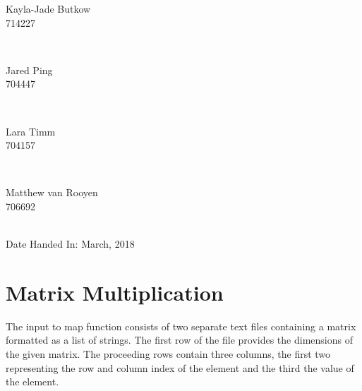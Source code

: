 \documentclass[10pt,twocolumn]{witseiepaper}
\begin{document}
\begin{titlepage}
		
		\begin{minipage}{0.4\textwidth}
			\begin{flushleft} \large
				Kayla-Jade Butkow \\ 714227 %
			\end{flushleft}
		\end{minipage}
		~
		\begin{minipage}{0.4\textwidth}
			\begin{flushright} \large
				Jared Ping \\ 704447
			\end{flushright}
		\end{minipage}\\[1cm]
		
		\begin{minipage}{0.4\textwidth}
			\begin{flushleft} \large
				Lara Timm \\ 704157
			\end{flushleft}
		\end{minipage}
		~
		\begin{minipage}{0.4\textwidth}
			\begin{flushright} \large
				Matthew van Rooyen \\ 706692
			\end{flushright}
		\end{minipage}\\[1cm]
		
		
		
		{\large Date Handed In:  March, 2018}\\[1cm] 
		
	\end{titlepage}


\pagestyle{plain}
\setcounter{page}{1}
\onecolumn
%
\section{Matrix Multiplication}

The input to map function consists of two separate text files containing a matrix formatted as a list of strings. The first row of the file provides the dimensions of the given matrix. The proceeding rows contain three columns, the first two representing the row and column index of the element and the third the value of the element.
\end{document}
